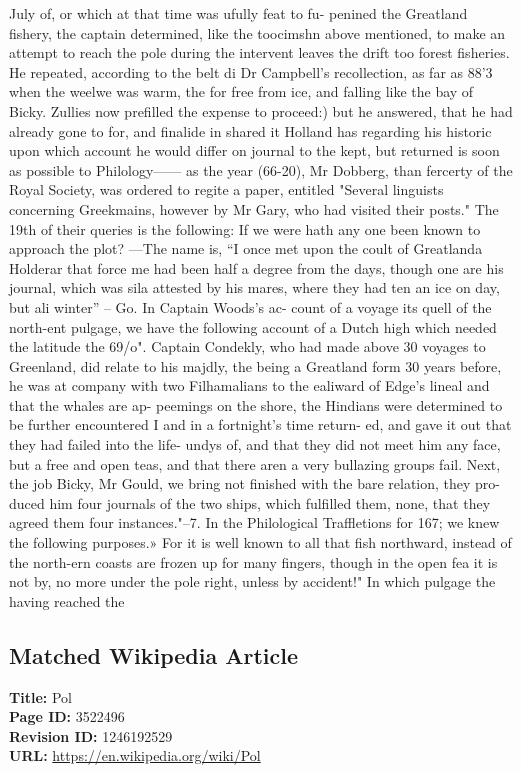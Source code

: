 \documentclass{article}
\begin{document}
July of, or which at that time was ufully feat to fu- penined the Greatland fishery, the captain determined, like the toocimshn above mentioned, to make an attempt to reach the pole during the intervent leaves the drift too forest fisheries. He repeated, according to the belt di Dr Campbell's recollection, as far as 88'3 when the weelwe was warm, the for free from ice, and falling like the bay of Bicky. Zullies now prefilled the expense to proceed:) but he answered, that he had already gone to for, and finalide in shared it Holland has regarding his historic upon which account he would differ on journal to the kept, but returned is soon as possible to Philology—— as the year (66-20), Mr Dobberg, than fercerty of the Royal Society, was ordered to regite a paper, entitled "Several linguists concerning Greekmains, however by Mr Gary, who had visited their posts." The 19th of their queries is the following: If we were hath any one been known to approach the plot? —The name is, “I once met upon the coult of Greatlanda Holderar that force me had been half a degree from the days, though one are his journal, which was sila attested by his mares, where they had ten an ice on day, but ali winter” – Go. In Captain Woods’s ac- count of a voyage its quell of the north-ent pulgage, we have the following account of a Dutch high which needed the latitude the 69/o". Captain Condekly, who had made above 30 voyages to Greenland, did relate to his majdly, the being a Greatland form 30 years before, he was at company with two Filhamalians to the ealiward of Edge’s lineal and that the whales are ap- peemings on the shore, the Hindians were determined to be further encountered I and in a fortnight’s time return- ed, and gave it out that they had failed into the life- undys of, and that they did not meet him any face, but a free and open teas, and that there aren a very bullazing groups fail. Next, the job Bicky, Mr Gould, we bring not finished with the bare relation, they pro-duced him four journals of the two ships, which fulfilled them, none, that they agreed them four instances."--7. In the Philological Traffletions for 167; we knew the following purposes.» For it is well known to all that fish northward, instead of the north-ern coasts are frozen up for many fingers, though in the open fea it is not by, no more under the pole right, unless by accident!" In which pulgage the having reached the

\subsection*{Matched Wikipedia Article}
\textbf{Title:} Pol \\
\textbf{Page ID:} 3522496 \\
\textbf{Revision ID:} 1246192529 \\
\textbf{URL:} \url{https://en.wikipedia.org/wiki/Pol}
\end{document}
